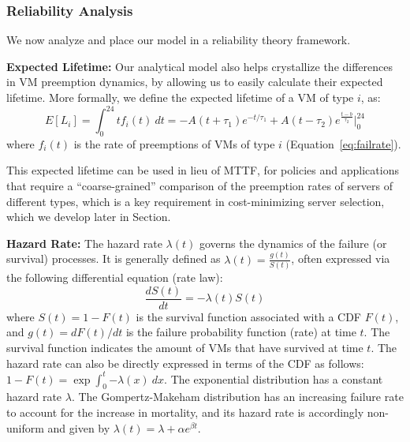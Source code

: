 \subsubsection{Reliability Analysis}


We now analyze and place our model in a reliability theory framework. 
%

\noindent \textbf{Expected Lifetime:} Our analytical model also helps crystallize the differences in VM preemption dynamics, by allowing us to easily calculate their expected lifetime. 
More formally, we define the expected lifetime of a VM of type $i$, as: 
\begin{equation}
  \label{eq:expected-lifetime}
E[L_i] =  \int_{0}^{24} t {f_i}(t)~dt =  -A(t+\tau_1)e^{-t/\tau_1} + A(t-\tau_2) e^{\frac{t-b}{\tau_2}} \biggr\rvert_{0}^{24}
\end{equation}
where $f_i(t)$ is the rate of preemptions of VMs of type $i$ (Equation~\ref{eq:failrate}).
%

This expected lifetime can be used in lieu of MTTF, for policies and applications that require a ``coarse-grained'' comparison of the preemption rates of servers of different types, which is a key requirement in cost-minimizing server selection, which we develop later in Section. 


\noindent \textbf{Hazard Rate:}
The hazard rate $\lambda(t)$ governs the dynamics of the failure (or survival) processes. It is generally defined as $\lambda(t) = \frac{g(t)}{S(t)}$, often expressed via the following differential equation (rate law):
\begin{equation}\label{eq:hazard}
\frac{dS(t)}{dt} = -\lambda(t) S(t)
\end{equation}
where $S(t) = 1 - F(t)$ is the survival function associated with a CDF $F(t)$, and $g(t)=dF(t)/dt$ is the failure probability function (rate) at time $t$. The survival function indicates the amount of VMs that have survived at time $t$.
The hazard rate can also be directly expressed in terms of the CDF as follows: $1-F(t) = \exp{\int_0^t{-\lambda(x) ~dx}}$. 
The exponential distribution has a constant hazard rate $\lambda$.
The Gompertz-Makeham distribution has an increasing failure rate to account for the increase in mortality, and its hazard rate is accordingly non-uniform and given by $\lambda(t) = \lambda + \alpha e^{\beta t}$.


